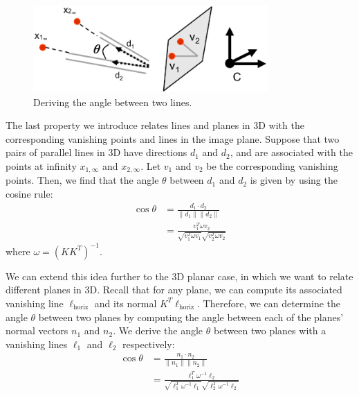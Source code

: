 \documentclass[a4paper, 12pt]{article}
\begin{document}
\begin{figure}[h!]
\centering
\includegraphics[width=0.8\textwidth]{figures/angles.png}
\caption{Deriving the angle between two lines.}
\label{fig:angles}
\end{figure}

The last property we introduce relates lines and planes in 3D with the corresponding vanishing points and lines in the image plane. Suppose that two pairs of parallel lines in 3D have directions $d_1$ and $d_2$, and are associated with the points at infinity $x_{1,\infty}$ and $x_{2,\infty}$. Let $v_1$ and $v_2$ be the corresponding vanishing points. Then, we find that the angle $\theta$ between $d_1$ and $d_2$ is given by using the cosine rule:
\begin{equation}
    \begin{split}
        \cos\theta &= \frac{d_1 \cdot d_2}{\|d_1\| \|d_2\|}\\
        &= \frac{v_1^T\omega v_2}{\sqrt{v_1^T \omega v_1}\sqrt{v_2^T \omega v_2}}
    \end{split}
    \label{eq:angles}
\end{equation}
where $\omega = (KK^T)^{-1}$. 

We can extend this idea further to the 3D planar case, in which we want to relate different planes in 3D. Recall that for any plane, we can compute its associated vanishing line $\ell_\mathrm{{horiz}}$ and its normal $K^T \ell_{\mathrm{horiz}}$. Therefore, we can determine the angle $\theta$ between two planes by computing the angle between each of the planes' normal vectors $n_1$ and $n_2$. We derive the angle $\theta$ between two planes with a vanishing lines $\ell_1$ and $\ell_2$ respectively:
\begin{equation}
    \begin{split}
        \cos\theta &= \frac{n_1 \cdot n_2}{\|n_1\| \|n_2\|}\\
        &= \frac{\ell_1^T\omega^{-1} \ell_2}{\sqrt{\ell_1^T \omega^{-1} \ell_1}\sqrt{\ell_2^T \omega^{-1} \ell_2}}
    \end{split}
\end{equation}
\end{document}
